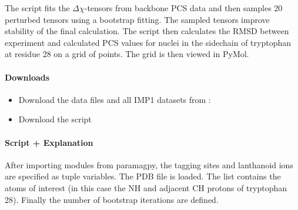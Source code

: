 \documentclass[a4paper,10pt,english,openany,oneside]{sphinxmanual}
\begin{document}
The script fits the \({\Delta\chi}\)-tensors from backbone PCS data and then samples 20 perturbed tensors using a bootstrap fitting. The sampled tensors improve stability of the final calculation. The script then calculates the RMSD between experiment and calculated PCS values for nuclei in the sidechain of tryptophan at residue 28 on a grid of points. The grid is then viewed in PyMol.


\paragraph{Downloads}
\label{\detokenize{examples/pcs_fit_atom:downloads}}\begin{itemize}
\item {} 
Download the data files  and all IMP1 datasets from :

\item {} 
Download the script 

\end{itemize}


\paragraph{Script + Explanation}
\label{\detokenize{examples/pcs_fit_atom:script-explanation}}
After importing modules from paramagpy, the tagging sites and lanthanoid ions are specified as tuple variables. The PDB file is loaded. The  list contains the atoms of interest (in this case the NH and adjacent CH protons of tryptophan 28). Finally the number of bootstrap iterations are defined.
\end{document}
